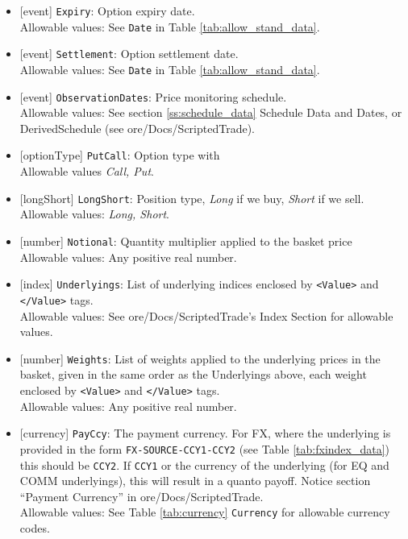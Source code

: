 \begin{itemize}
    \item{}[event] \lstinline!Expiry!: Option expiry date. \\
    Allowable values: See \lstinline!Date! in Table \ref{tab:allow_stand_data}.
    \item{}[event] \lstinline!Settlement!: Option settlement date. \\
    Allowable values: See \lstinline!Date! in Table \ref{tab:allow_stand_data}.
    \item{}[event] \lstinline!ObservationDates!: Price monitoring schedule. \\
    Allowable values: See section \ref{ss:schedule_data} Schedule Data and Dates, or DerivedSchedule (see ore/Docs/ScriptedTrade).
    \item{}[optionType] \lstinline!PutCall!: Option type with \\
          Allowable values \emph{Call, Put}.
    \item{}[longShort] \lstinline!LongShort!: Position type,
          {\em Long} if we buy, {\em Short} if we sell.\\
    Allowable values: \emph{Long, Short}.
        \item{}[number] \lstinline!Notional!: Quantity multiplier applied to the
          basket price \\
          Allowable values: Any positive real number.
    \item{}[index] \lstinline!Underlyings!: List of underlying indices
          enclosed by {\tt <Value>} and {\tt </Value>} tags. \\
          Allowable values: See ore/Docs/ScriptedTrade's Index Section for allowable values.
     \item{}[number] \lstinline!Weights!: List of weights applied to the
          underlying prices in the basket, given in the same order as
          the Underlyings above, each weight enclosed by {\tt <Value>} and {\tt </Value>} tags.\\
          Allowable values: Any positive real number.
    \item{}[currency] \lstinline!PayCcy!: The payment currency. For FX, where the underlying is provided
      in the form \lstinline!FX-SOURCE-CCY1-CCY2! (see Table \ref{tab:fxindex_data}) this should
      be \lstinline!CCY2!. If \lstinline!CCY1! or the currency of the underlying (for EQ and
      COMM underlyings), this will result in a quanto payoff. Notice section ``Payment Currency'' in ore/Docs/ScriptedTrade. \\
        Allowable values: See Table \ref{tab:currency} \lstinline!Currency! for allowable currency codes.
\end{itemize}

